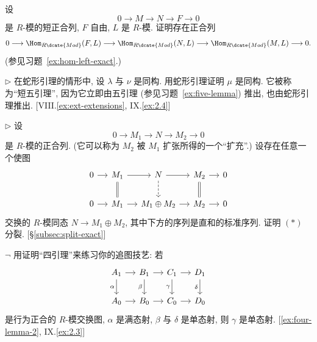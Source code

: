 \begin{prob}
\label{ex:free-hom-exact}
设
\[
0 \longrightarrow M \longrightarrow N \longrightarrow F \longrightarrow 0
\]
是 $R$-模的短正合列, $F$ 自由, $L$ 是 $R$-模. 证明存在正合列
\[
0 \longrightarrow \Hom_{R\dcate{Mod}}(F, L) \longrightarrow \Hom_{R\dcate{Mod}}(N, L) \longrightarrow \Hom_{R\dcate{Mod}}(M, L) \longrightarrow 0.
\]
(参见习题~\ref{ex:hom-left-exact}.)
\end{prob}

\begin{prob}
\label{ex:short-five}
$\triangleright$ 在蛇形引理的情形中, 设 $\lambda$ 与 $\nu$ 是同构. 用蛇形引理证明 $\mu$ 是同构. 它被称为``短五引理'', 因为它立即由五引理 (参见习题~\ref{ex:five-lemma}) 推出, 也由蛇形引理推出. [VIII.\ref{ex:ext-extensions}, IX.\ref{ex:2.4}]
\end{prob}

\begin{prob}
\label{ex:extension-splits}
$\triangleright$ 设
\begin{equation*}
0 \longrightarrow M_1 \longrightarrow N \longrightarrow M_2 \longrightarrow 0 \tag{$*$}
\end{equation*}
是 $R$-模的正合列. (它可以称为 $M_2$ 被 $M_1$ 扩张所得的一个``扩充''.) 设存在任意一个使图
\[
\begin{tikzcd}[column sep=small]
0 \ar[r] & M_1 \ar[r] \ar[d,equal] & N \ar[r] \ar[d,dashed] & M_2 \ar[r] \ar[d,equal] & 0 \\
0 \ar[r] & M_1 \ar[r] & M_1\oplus M_2 \ar[r] & M_2 \ar[r] & 0
\end{tikzcd}
\]
交换的 $R$-模同态 $N \to M_1 \oplus M_2$, 其中下方的序列是直和的标准序列. 证明 $(*)$ 分裂. [\S\ref{subsec:split-exact}]
\end{prob}

\begin{prob}
\label{ex:four-lemma}
$\neg$ 用证明``四引理''来练习你的追图技艺: 若
\[
\begin{tikzcd}[column sep=small]
A_1 \ar[r] \ar[d, "\alpha"'] & B_1 \ar[r] \ar[d, "\beta"'] & C_1 \ar[r] \ar[d, "\gamma"'] & D_1 \ar[d, "\delta"'] \\
A_0 \ar[r] & B_0 \ar[r] & C_0 \ar[r] & D_0
\end{tikzcd}
\]
是行为正合的 $R$-模交换图, $\alpha$ 是满态射, $\beta$ 与 $\delta$ 是单态射, 则 $\gamma$ 是单态射. [\ref{ex:four-lemma-2}, IX.\ref{ex:2.3}]
\end{prob}

